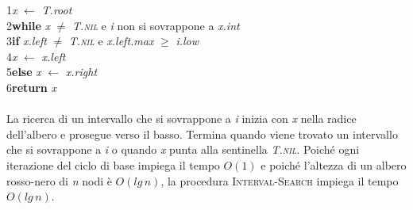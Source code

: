 \documentclass[10pt, a4paper]{report}
\newcommand\firsttab[1][0.5cm]{\hspace*{#1}}
\newcommand\secondtab[1][1cm]{\hspace*{#1}}
\newcommand\thirdtab[1][1.5cm]{\hspace*{#1}}
\begin{document}
\begin{description}
1\firsttab\textit{x} $\leftarrow$ \textit{T.root}\\
2\firsttab\textbf{while} \textit{x} $\neq$ \textit{T.\textsc{nil}} e \textit{i} non si sovrappone a \textit{x.int}\\
3\secondtab\textbf{if} \textit{x.left} $\neq$ \textit{T.\textsc{nil}} e \textit{x.left.max} $\geq$ \textit{i.low}\\
4\thirdtab\textit{x} $\leftarrow$ \textit{x.left}\\
5\secondtab\textbf{else} \textit{x} $\leftarrow$ \textit{x.right}\\
6\firsttab\textbf{return} \textit{x}\\\\
La ricerca di un intervallo che si sovrappone a \textit{i} inizia con \textit{x} nella radice dell'albero e prosegue verso il basso. Termina quando viene trovato un intervallo che si sovrappone a \textit{i} o quando \textit{x} punta alla sentinella \textit{T.\textsc{nil}}. Poiché ogni iterazione del ciclo di base impiega il tempo $O(1)$ e poiché l'altezza di un albero rosso-nero di \textit{n} nodi è $O(lg\,n)$, la procedura \textsc{Interval-Search} impiega il tempo $O(lg\,n)$.
\end{description}
\end{document}
